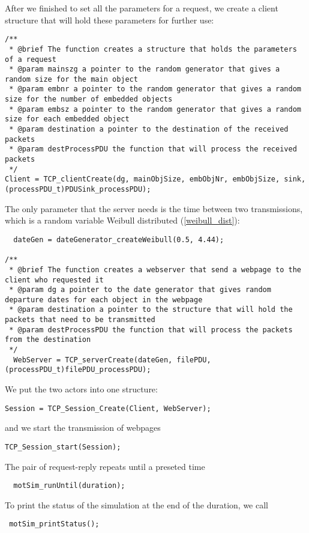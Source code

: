  After we finished to set all the parameters for a request, we create a client structure that will hold these parameters for further use:
\begin{verbatim}
/**
 * @brief The function creates a structure that holds the parameters of a request
 * @param mainszg a pointer to the random generator that gives a random size for the main object
 * @param embnr a pointer to the random generator that gives a random size for the number of embedded objects
 * @param embsz a pointer to the random generator that gives a random size for each embedded object
 * @param destination a pointer to the destination of the received packets
 * @param destProcessPDU the function that will process the received packets
 */
Client = TCP_clientCreate(dg, mainObjSize, embObjNr, embObjSize, sink, (processPDU_t)PDUSink_processPDU);
\end{verbatim}

The only parameter that the server needs is the time between two transmissions, which is a random
variable Weibull distributed (\ref{weibull_dist}):
\begin{verbatim}
  dateGen = dateGenerator_createWeibull(0.5, 4.44);
  
/**
 * @brief The function creates a webserver that send a webpage to the client who requested it
 * @param dg a pointer to the date generator that gives random departure dates for each object in the webpage
 * @param destination a pointer to the structure that will hold the packets that need to be transmitted
 * @param destProcessPDU the function that will process the packets from the destination
 */
  WebServer = TCP_serverCreate(dateGen, filePDU, (processPDU_t)filePDU_processPDU);
\end{verbatim}

 We put the two actors into one structure:
\begin{verbatim}
Session = TCP_Session_Create(Client, WebServer);
\end{verbatim}
and we start the transmission of webpages
\begin{verbatim}  
TCP_Session_start(Session);
\end{verbatim}
The pair of request-reply repeats until a preseted time
\begin{verbatim}
  motSim_runUntil(duration);
\end{verbatim}
To print the status of the simulation at the end of the duration, we call
\begin{verbatim} 
 motSim_printStatus();
\end{verbatim}

